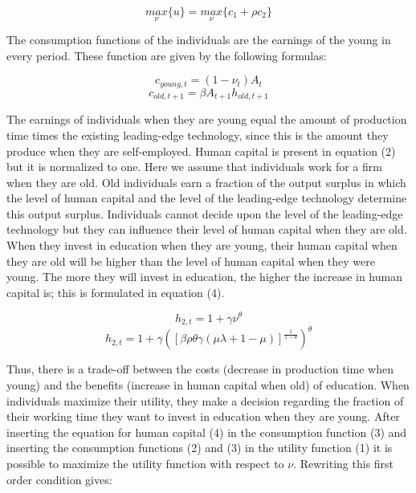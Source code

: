 \documentclass[a4paper,11pt]{article} %
\begin{document}
\begin{equation}
  \underset{\nu}{max}\{u\}=\underset{\nu}{max}\{c_1+\rho c_2\}
\end{equation}

The consumption functions of the individuals are the earnings of the young in every period. These function are given by the following formulas:

\begin{equation}
  c_{young,t}=(1-\nu_t)A_t
\end{equation}
\begin{equation}
  c_{old,t+1}=\beta A_{t+1}h_{old,t+1}
\end{equation}

The earnings of individuals when they are young equal the amount of production time times the existing leading-edge technology, since this is the amount they produce when they are self-employed. Human capital is present in equation (2) but it is normalized to one. Here we assume that individuals work for a firm when they are old. Old individuals earn a fraction of the output surplus in which the level of human capital and the level of the leading-edge technology determine this output surplus. Individuals cannot decide upon the level of the leading-edge technology but they can influence their level of human capital when they are old. When they invest in education when they are young, their human capital when they are old will be higher than the level of human capital when they were young. The more they will invest in education, the higher the increase in human capital is; this is formulated in equation (4).

\begin{equation*}
  h_{2,t}=1+\gamma\nu^{\theta}
\end{equation*}
\begin{equation}
  h_{2,t}=1+\gamma\left(\left[\beta\rho\theta\gamma\left(\mu\lambda+1-\mu\right)\right]^{\frac{1}{1-\theta}}\right)^{\theta}
\end{equation}

Thus, there is a trade-off between the costs (decrease in production time when young) and the benefits (increase in human capital when old) of education. When individuals maximize their utility, they make a decision regarding the fraction of their working time they want to invest in education when they are young. 
After inserting the equation for human capital (4) in the consumption function (3) and inserting the consumption functions (2) and (3) in the utility function (1) it is possible to maximize the utility function with respect to \(\nu\). Rewriting this first order condition gives:
\end{document}
